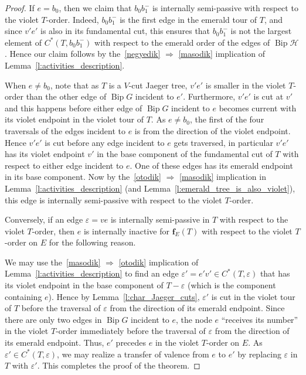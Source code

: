 \documentclass[10pt]{amsart}
\theoremstyle{definition}\newtheorem{defi}[theo]{Definition}
\theoremstyle{remark}\newtheorem{rema}[theo]{Remark}
\newcommand{\HH}{\mathcal H}
\DeclareMathOperator{\bip}{Bip}
\DeclareMathOperator{\Bip}{Bip}
\begin{document}
\begin{proof}
If $e=b_0$, then we claim that $b_0b_1^-$ is internally semi-passive with respect to the violet $T$-order. Indeed, $b_0b_1^-$ is the first edge in the emerald tour of $T$, and since $v'e'$ is also in its fundamental cut, this ensures that $b_0b_1^-$ is not the largest element of $C^*(T,b_0b_1^-)$ with respect to the emerald order of the edges of $\bip\HH$. Hence our claim follows by the~\ref{negyedik} $\Rightarrow$ \ref{masodik} implication of Lemma~\ref{l:activities_description}.

When $e\ne b_0$, note that as $T$ is a $V$-cut Jaeger tree, $v'e'$ is smaller in the violet $T$-order than the other edge of $\bip G$ incident to $e'$. Furthermore, $v'e'$ is cut at $v'$ and this happens before either edge of $\bip G$ incident to $e$ becomes current with its violet endpoint in the violet tour of $T$. As $e\neq b_0$, the first of the four traversals of the edges incident to $e$ is from the direction of the violet endpoint. Hence $v'e'$ is cut before any edge incident to $e$ gets traversed, in particular $v'e'$ has its violet endpoint $v'$ in the base component of the fundamental cut of $T$ with respect to either edge incident to $e$. One of these edges has its emerald endpoint in its base component. Now by the~\ref{otodik} $\Rightarrow$ \ref{masodik} implication in Lemma~\ref{l:activities_description} (and Lemma~\ref{l:emerald_tree_is_also_violet}), this edge is internally semi-passive with respect to the violet $T$-order. 

Conversely, if an edge $\varepsilon=ve$ is internally semi-passive in $T$ with respect to the violet $T$-order, then $e$ is internally inactive for $\mathbf f_E(T)$ with respect to the violet $T$-order on $E$ for the following reason.

We may use the~\ref{masodik} $\Rightarrow$ \ref{otodik} implication of Lemma~\ref{l:activities_description} to find an edge $\varepsilon'=e'v' \in C^*(T,\varepsilon)$ that has its violet endpoint in the base component of $T-\varepsilon$ (which is the component containing $e$). Hence by Lemma~\ref{l:char_Jaeger_cuts}, $\varepsilon'$ is cut in the violet tour of $T$ before the traversal of $\varepsilon$ from the direction of its emerald endpoint. Since there are only two edges in $\Bip G$ incident to $e$, the node $e$ ``receives its number'' in the violet $T$-order immediately before the traversal of $\varepsilon$ from the direction of its emerald endpoint. Thus, $e'$ precedes $e$ in the violet $T$-order on $E$. As $\varepsilon'\in C^*(T,\varepsilon)$, we may realize a transfer of valence from $e$ to $e'$ by replacing $\varepsilon$ in $T$ with $\varepsilon'$. This completes the proof of the theorem.
\end{proof}
\end{document}

